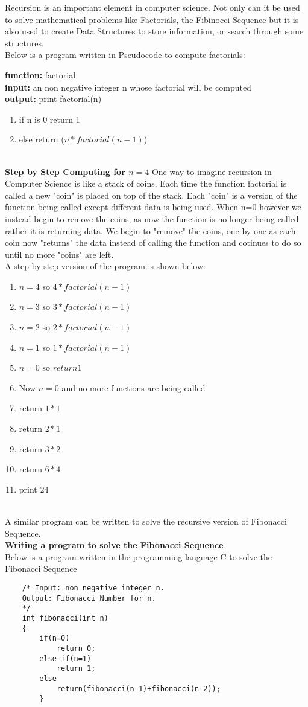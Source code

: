 \documentclass{article}
\begin{document}
Recursion is an important element in computer science. Not only can it be used to solve mathematical problems like Factorials, the Fibinocci Sequence but it is also used to create Data Structures to store information, or search through some structures. 
\\Below is a program written in Pseudocode to compute factorials:
\begin{center}
	{\bf function:} factorial
	\\
	{\bf input:} an non negative integer n whose factorial will be computed
	\\
	{\bf output:} print factorial(n)
	\begin{enumerate}
	
		\item if n is 0 return 1
		\item else return ($n * factorial(n-1)$)
	\end{enumerate}
\end{center}
~\\
{\bf Step by Step Computing for $n=4$}
One way to imagine recursion in Computer Science is like a stack of coins. Each time the function factorial is called a new "coin" is placed on top of the stack. Each "coin" is a version of the function being called except different data is being used.  When n=0 however we instead begin to remove the coins, as now the function is no longer being called rather it is returning data. We begin to "remove" the coins, one by one as each coin now "returns" the data instead of calling the function and cotinues to do so until no more "coins" are left.
\\
A step by step version of the program is shown below:
\begin{enumerate}
	\item $n=4$ so $4* factorial(n-1)$
	\item $n=3$ so $3* factorial(n-1)$
	\item $n=2$ so $2* factorial(n-1)$
	\item $n=1$ so $1* factorial(n-1)$
	\item $n=0$ so $return 1$
	\item Now $n=0$ and no more functions are being called 
	\item return $1*1$
	\item return $2*1$
	\item return $3*2$
	\item return $6*4$
	\item print $24$
\end{enumerate}
~\\A similar program can be written to solve the recursive version of Fibonacci Sequence.  
\\
{\bf Writing a program to solve the Fibonacci Sequence}
\\
Below is a program written in the programming language C to solve the Fibonacci Sequence 
\\
\begin{lstlisting}
	/* Input: non negative integer n.
	Output: Fibonacci Number for n.
	*/
	int fibonacci(int n)
	{
		if(n=0)
			return 0;
		else if(n=1)
			return 1;
		else
			return(fibonacci(n-1)+fibonacci(n-2));
		}
\end{lstlisting}
		
\end{document}
